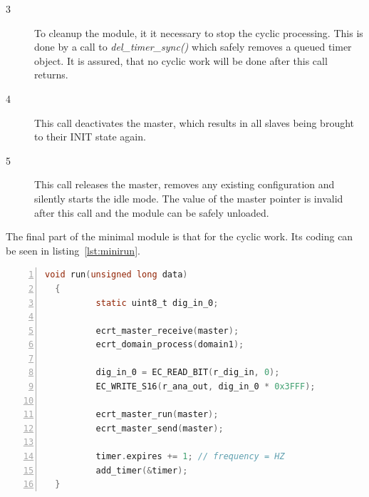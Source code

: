 \documentclass[a4paper,12pt,BCOR6mm,bibtotoc,idxtotoc]{scrbook}
\newcommand{\linenum}[1]{\normalfont\textcircled{\tiny #1}}
\begin{document}
\begin{description}
\item[\linenum{3}] To cleanup the module, it it
  necessary to stop the cyclic processing. This is done by a call to
  \textit{del\_timer\_sync()} which safely removes a queued timer
  object. It is assured, that no cyclic work will be done after this
  call returns.
\item[\linenum{4}] This call deactivates the
  master, which results in all slaves being brought to their INIT
  state again.
\item[\linenum{5}] This call releases the master,
  removes any existing configuration and silently starts the idle
  mode. The value of the master pointer is invalid after this call and
  the module can be safely unloaded.
\end{description}

The final part of the minimal module is that for the cyclic work. Its
coding can be seen in listing~\ref{lst:minirun}.

\begin{lstlisting}[gobble=2,language=C,numbers=left,caption={Minimal cyclic
    function},label={lst:minirun}]
  void run(unsigned long data)
  {
          static uint8_t dig_in_0;

          ecrt_master_receive(master);
          ecrt_domain_process(domain1);

          dig_in_0 = EC_READ_BIT(r_dig_in, 0);
          EC_WRITE_S16(r_ana_out, dig_in_0 * 0x3FFF);

          ecrt_master_run(master);
          ecrt_master_send(master);

          timer.expires += 1; // frequency = HZ
          add_timer(&timer);
  }
\end{lstlisting}
\end{document}
